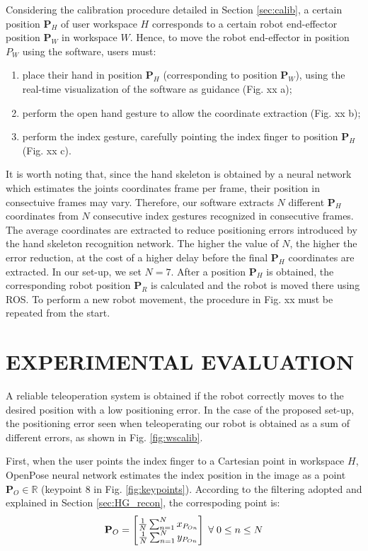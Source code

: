 \documentclass[letterpaper, 10 pt, conference]{ieeeconf}  %
\begin{document}
Considering the calibration procedure detailed in Section \ref{sec:calib}, a certain position $\mathbf{P}_{H}$ of user workspace $H$ corresponds to a certain robot end-effector position $\mathbf{P}_{W}$ in workspace $W$. Hence, to move the robot end-effector in position $P_W$  using the software, users must: %
\begin{enumerate}
\item place their hand in position $\mathbf{P}_H$ (corresponding to position $\mathbf{P}_W$), using the real-time visualization of the software as guidance (Fig. xx a);
\item perform the open hand gesture to allow the coordinate extraction (Fig. xx b);
\item perform the index gesture, carefully pointing the index finger to position $\mathbf{P}_H$ (Fig. xx c).
\end{enumerate}

It is worth noting that, since the hand skeleton is obtained by a neural network which estimates the joints coordinates frame per frame, their position in consectuive frames may vary. Therefore, our software extracts $N$ different $\mathbf{P}_H$ coordinates from $N$ consecutive index gestures recognized in consecutive frames. The average coordinates are extracted to reduce positioning errors introduced by the hand skeleton recognition network. The higher the value of $N$, the higher the error reduction, at the cost of a higher delay before the final $\mathbf{P}_H$ coordinates are extracted. In our set-up, we set $N = 7$.
After a position $\mathbf{P}_H$ is obtained, the corresponding robot position $\mathbf{P}_R$ is calculated and the robot is moved there using ROS.
To perform a new robot movement, the procedure in Fig. xx must be repeated from the start. %

\section{EXPERIMENTAL EVALUATION}\label{sec:experiments}
A reliable teleoperation system is obtained if the robot correctly moves to the desired position with a low positioning error. In the case of the proposed set-up, the positioning error seen when teleoperating our robot is obtained as a sum of different errors, as shown in Fig. \ref{fig:wscalib}.

First, when the user points the index finger to a Cartesian point in workspace $H$, OpenPose neural network estimates the index position in the image as a point $\mathbf{P}_O \in \mathbb{R}$ (keypoint $8$ in Fig. \ref{fig:keypoints}). According to the filtering adopted and explained in Section \ref{sec:HG_recon}, the correspoding point is:
\begin{equation}
\mathbf{P}_O = \begin{bmatrix}
\frac{1}{N}\sum_{n=1}^{N}x_{P_{On}} \\
\frac{1}{N}\sum_{n=1}^{N}y_{P_{On}}
\end{bmatrix}
\thickspace \forall\thickspace 0 \leq n \leq N
\end{equation}
\end{document}
